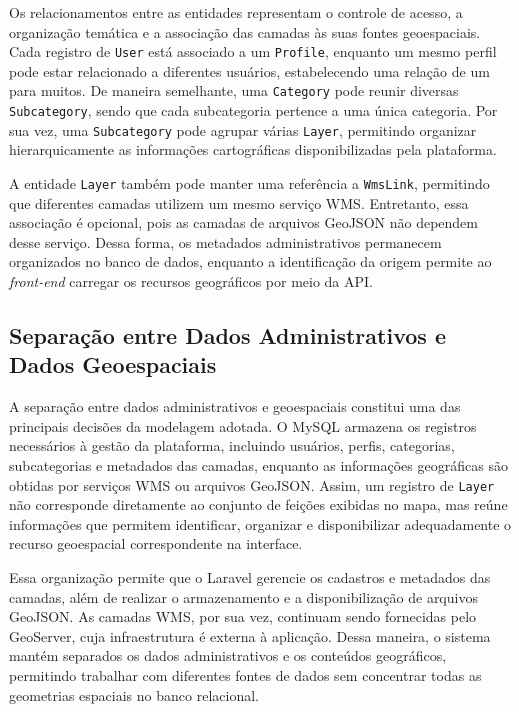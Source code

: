Os relacionamentos entre as entidades representam o controle de acesso, a organização temática e a associação das camadas às suas fontes geoespaciais. Cada registro de \texttt{User} está associado a um \texttt{Profile}, enquanto um mesmo perfil pode estar relacionado a diferentes usuários, estabelecendo uma relação de um para muitos. De maneira semelhante, uma \texttt{Category} pode reunir diversas \texttt{Subcategory}, sendo que cada subcategoria pertence a uma única categoria. Por sua vez, uma \texttt{Subcategory} pode agrupar várias \texttt{Layer}, permitindo organizar hierarquicamente as informações cartográficas disponibilizadas pela plataforma.

A entidade \texttt{Layer} também pode manter uma referência a \texttt{WmsLink}, permitindo que diferentes camadas utilizem um mesmo serviço WMS. Entretanto, essa associação é opcional, pois as camadas de arquivos GeoJSON não dependem desse serviço. Dessa forma, os metadados administrativos permanecem organizados no banco de dados, enquanto a identificação da origem permite ao \textit{front-end} carregar os recursos geográficos por meio da API.

\subsection{Separação entre Dados Administrativos e Dados Geoespaciais}
\label{sec:separacao-dados}

A separação entre dados administrativos e geoespaciais constitui uma das principais decisões da modelagem adotada. O MySQL armazena os registros necessários à gestão da plataforma, incluindo usuários, perfis, categorias, subcategorias e metadados das camadas, enquanto as informações geográficas são obtidas por serviços WMS ou arquivos GeoJSON. Assim, um registro de \texttt{Layer} não corresponde diretamente ao conjunto de feições exibidas no mapa, mas reúne informações que permitem identificar, organizar e disponibilizar adequadamente o recurso geoespacial correspondente na interface.

Essa organização permite que o Laravel gerencie os cadastros e metadados das camadas, além de realizar o armazenamento e a disponibilização de arquivos GeoJSON. As camadas WMS, por sua vez, continuam sendo fornecidas pelo GeoServer, cuja infraestrutura é externa à aplicação. Dessa maneira, o sistema mantém separados os dados administrativos e os conteúdos geográficos, permitindo trabalhar com diferentes fontes de dados sem concentrar todas as geometrias espaciais no banco relacional.

